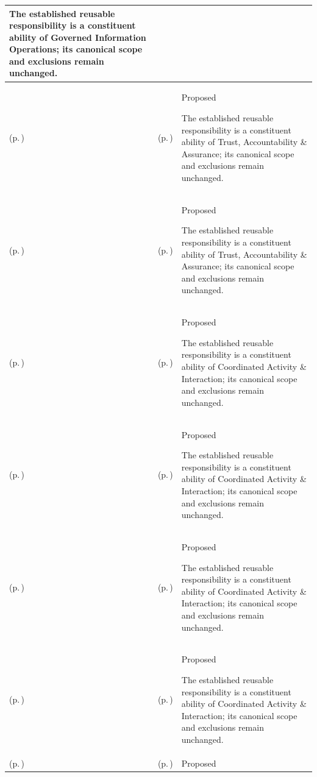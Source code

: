 \begin{longtable}{|>{\raggedright\arraybackslash}p{0.27\TableWidth}|>{\raggedright\arraybackslash}p{0.27\TableWidth}|>{\raggedright\arraybackslash}p{0.46\TableWidth}|}
The established reusable responsibility is a constituent ability of Governed Information Operations; its canonical scope and exclusions remain unchanged.\\\hline
\nameref{cap:ec-trust-accountability-assurance} (p.\,\pageref{cap:ec-trust-accountability-assurance}) & \nameref{cap:ec-06} (p.\,\pageref{cap:ec-06}) & Proposed

The established reusable responsibility is a constituent ability of Trust, Accountability \& Assurance; its canonical scope and exclusions remain unchanged.\\\hline
\nameref{cap:ec-trust-accountability-assurance} (p.\,\pageref{cap:ec-trust-accountability-assurance}) & \nameref{cap:ec-07} (p.\,\pageref{cap:ec-07}) & Proposed

The established reusable responsibility is a constituent ability of Trust, Accountability \& Assurance; its canonical scope and exclusions remain unchanged.\\\hline
\nameref{cap:ec-coordinated-activity-interaction} (p.\,\pageref{cap:ec-coordinated-activity-interaction}) & \nameref{cap:ec-08} (p.\,\pageref{cap:ec-08}) & Proposed

The established reusable responsibility is a constituent ability of Coordinated Activity \& Interaction; its canonical scope and exclusions remain unchanged.\\\hline
\nameref{cap:ec-coordinated-activity-interaction} (p.\,\pageref{cap:ec-coordinated-activity-interaction}) & \nameref{cap:ec-09} (p.\,\pageref{cap:ec-09}) & Proposed

The established reusable responsibility is a constituent ability of Coordinated Activity \& Interaction; its canonical scope and exclusions remain unchanged.\\\hline
\nameref{cap:ec-coordinated-activity-interaction} (p.\,\pageref{cap:ec-coordinated-activity-interaction}) & \nameref{cap:ec-10} (p.\,\pageref{cap:ec-10}) & Proposed

The established reusable responsibility is a constituent ability of Coordinated Activity \& Interaction; its canonical scope and exclusions remain unchanged.\\\hline
\nameref{cap:ec-coordinated-activity-interaction} (p.\,\pageref{cap:ec-coordinated-activity-interaction}) & \nameref{cap:ec-11} (p.\,\pageref{cap:ec-11}) & Proposed

The established reusable responsibility is a constituent ability of Coordinated Activity \& Interaction; its canonical scope and exclusions remain unchanged.\\\hline
\nameref{cap:ec-trust-accountability-assurance} (p.\,\pageref{cap:ec-trust-accountability-assurance}) & \nameref{cap:ec-12} (p.\,\pageref{cap:ec-12}) & Proposed


\end{longtable}
